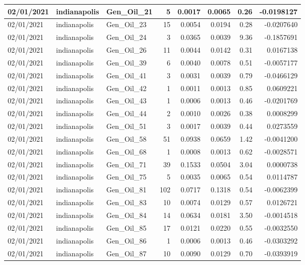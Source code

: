 \documentclass[
  letterpaper,
  DIV=11,
  numbers=noendperiod]{scrartcl}
\begin{document}
\begin{tabular}{l|l|l|r|r|r|r|r}
\hline
02/01/2021 & indianapolis & Gen\_Oil\_21 & 5 & 0.0017 & 0.0065 & 0.26 & -0.0198127\\
\hline
02/01/2021 & indianapolis & Gen\_Oil\_23 & 15 & 0.0054 & 0.0194 & 0.28 & -0.0207640\\
\hline
02/01/2021 & indianapolis & Gen\_Oil\_24 & 3 & 0.0365 & 0.0039 & 9.36 & -0.1857691\\
\hline
02/01/2021 & indianapolis & Gen\_Oil\_26 & 11 & 0.0044 & 0.0142 & 0.31 & 0.0167138\\
\hline
02/01/2021 & indianapolis & Gen\_Oil\_39 & 6 & 0.0040 & 0.0078 & 0.51 & -0.0057177\\
\hline
02/01/2021 & indianapolis & Gen\_Oil\_41 & 3 & 0.0031 & 0.0039 & 0.79 & -0.0466129\\
\hline
02/01/2021 & indianapolis & Gen\_Oil\_42 & 1 & 0.0011 & 0.0013 & 0.85 & 0.0609221\\
\hline
02/01/2021 & indianapolis & Gen\_Oil\_43 & 1 & 0.0006 & 0.0013 & 0.46 & -0.0201769\\
\hline
02/01/2021 & indianapolis & Gen\_Oil\_44 & 2 & 0.0010 & 0.0026 & 0.38 & 0.0008299\\
\hline
02/01/2021 & indianapolis & Gen\_Oil\_51 & 3 & 0.0017 & 0.0039 & 0.44 & 0.0273559\\
\hline
02/01/2021 & indianapolis & Gen\_Oil\_58 & 51 & 0.0938 & 0.0659 & 1.42 & -0.0041200\\
\hline
02/01/2021 & indianapolis & Gen\_Oil\_68 & 1 & 0.0008 & 0.0013 & 0.62 & -0.0028571\\
\hline
02/01/2021 & indianapolis & Gen\_Oil\_71 & 39 & 0.1533 & 0.0504 & 3.04 & 0.0000738\\
\hline
02/01/2021 & indianapolis & Gen\_Oil\_75 & 5 & 0.0035 & 0.0065 & 0.54 & 0.0114787\\
\hline
02/01/2021 & indianapolis & Gen\_Oil\_81 & 102 & 0.0717 & 0.1318 & 0.54 & -0.0062399\\
\hline
02/01/2021 & indianapolis & Gen\_Oil\_83 & 10 & 0.0074 & 0.0129 & 0.57 & 0.0126721\\
\hline
02/01/2021 & indianapolis & Gen\_Oil\_84 & 14 & 0.0634 & 0.0181 & 3.50 & -0.0014518\\
\hline
02/01/2021 & indianapolis & Gen\_Oil\_85 & 17 & 0.0121 & 0.0220 & 0.55 & -0.0032550\\
\hline
02/01/2021 & indianapolis & Gen\_Oil\_86 & 1 & 0.0006 & 0.0013 & 0.46 & -0.0303292\\
\hline
02/01/2021 & indianapolis & Gen\_Oil\_87 & 10 & 0.0090 & 0.0129 & 0.70 & -0.0393919\\

\end{tabular}
\end{document}
